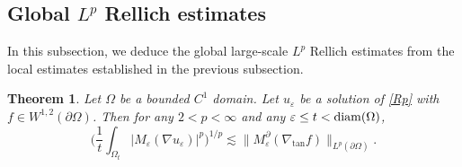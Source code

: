 \documentclass[reqno,12pt]{amsart} %
\newtheorem{theorem}{Theorem}[section]
\newtheorem{corollary}[theorem]{Corollary}
\theoremstyle{definition}
\theoremstyle{remark}
\numberwithin{equation}{section}
\newcommand{\cL}{\mathcal{L}}
\newcommand{\e}{\varepsilon}
\begin{document}

\subsection{Global $L^p$ Rellich estimates}
In this subsection, we deduce the global large-scale $L^p$ Rellich estimates from the local estimates established in the previous subsection.
\begin{theorem}\label{thm.C1Rellich.Rp}
Let $\Omega$ be a bounded $C^1$ domain.
Let $u_\e$ be a solution of \eqref{Rp} with $f\in W^{1,2}(\partial \Omega)$. Then for any $2<p<\infty$ and
 any $\e \le t < {\rm diam}(\Omega)$,
    \begin{equation}\label{est.GlobalLpRellich.C1}
        \bigg( \frac{1}{t} \int_{\Omega_t} |M_\e(\nabla u_\e)|^p \bigg)^{1/p} \lesssim \| M_\e^\partial(\nabla_{\tan} f) \|_{L^p(\partial \Omega)}.
    \end{equation}
\end{theorem}
\end{document}

